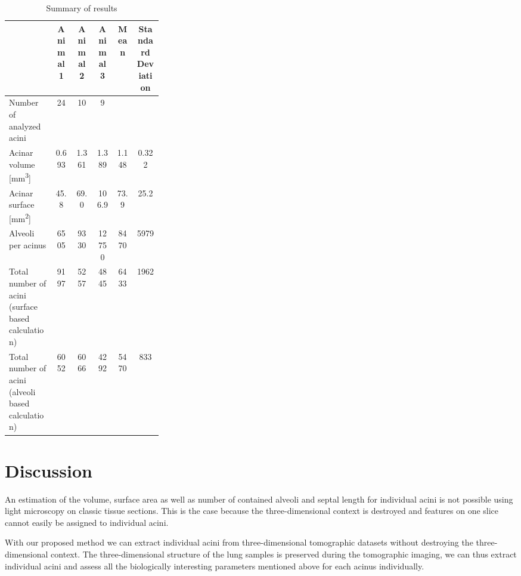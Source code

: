 \documentclass[a4paper,DIV=calc,abstract,english]{scrartcl}
\newcommand{\numberofaciniB}{24}
\newcommand{\numberofaciniD}{10}
\newcommand{\numberofaciniE}{9}
\newcommand{\totalnumberofaciniB}{9197}
\newcommand{\totalnumberofaciniD}{5257}
\newcommand{\totalnumberofaciniE}{4845}
\newcommand{\meantotalnumberofacini}{6433}
\newcommand{\meantotalnumberofaciniSTD}{1962} %
\newcommand{\totalnumberofaciniBVariant}{6052}
\newcommand{\totalnumberofaciniDVariant}{6066}
\newcommand{\totalnumberofaciniEVariant}{4292}
\newcommand{\meantotalnumberofaciniVariant}{5470}
\newcommand{\meantotalnumberofaciniSTDVariant}{833} %
\newcommand{\acinarvolumeB}{0.693} %
\newcommand{\acinarvolumeD}{1.361} %
\newcommand{\acinarvolumeE}{1.389} %
\newcommand{\meanacinarvolume}{1.148} %
\newcommand{\meanacinarvolumeSTD}{0.322} %
\newcommand{\numberofalveoliB}{6505}
\newcommand{\numberofalveoliD}{9330}
\newcommand{\numberofalveoliE}{12750}
\newcommand{\meannumberofalveoli}{8470} %
\newcommand{\meannumberofalveoliSTD}{5979}
\newcommand{\acinarsurfaceB}{45.8} %
\newcommand{\acinarsurfaceD}{69.0} %
\newcommand{\acinarsurfaceE}{106.9} %
\newcommand{\meanacinarsurface}{73.9} %
\newcommand{\meanacinarsurfaceSTD}{25.2}
\begin{document}
\begin{table}[htb]
	\centering
	\caption{Summary of results}
	\begin{tabular}{p{0.3\linewidth}ccccc}
	\toprule
																	& Animal 1 & Animal 2 & Animal 3 & Mean & Standard Deviation \\
	\midrule
	Number of analyzed acini 									& \numberofaciniB & \numberofaciniD & \numberofaciniE & & \\
	Acinar volume [\si{\milli\meter\cubed}]				& \acinarvolumeB & \acinarvolumeD & \acinarvolumeE & \meanacinarvolume & \meanacinarvolumeSTD \\
	Acinar surface [\si{\milli\meter\squared}]			& \acinarsurfaceB & \acinarsurfaceD & \acinarsurfaceE & \meanacinarsurface & \meanacinarsurfaceSTD \\
	Alveoli per acinus 											& \numberofalveoliB & \numberofalveoliD & \numberofalveoliE & \meannumberofalveoli & \meannumberofalveoliSTD \\
	Total number of acini (surface based calculation)	& \totalnumberofaciniB & \totalnumberofaciniD & \totalnumberofaciniE & \meantotalnumberofacini & \meantotalnumberofaciniSTD \\
	Total number of acini (alveoli based calculation)	& \totalnumberofaciniBVariant & \totalnumberofaciniDVariant & \totalnumberofaciniEVariant & \meantotalnumberofaciniVariant & \meantotalnumberofaciniSTDVariant \\
	\bottomrule
	\end{tabular}
	\label{tab:results}
\end{table}

\section{Discussion}\label{sec:discussion}
An estimation of the volume, surface area as well as number of contained alveoli and septal length for individual acini is not possible using light microscopy on classic tissue sections. This is the case because the three-dimensional context is destroyed and features on one slice cannot easily be assigned to individual acini.

With our proposed method we can extract individual acini from three-dimensional tomographic datasets without destroying the three-dimensional context. The three-dimensional structure of the lung samples is preserved during the tomographic imaging, we can thus extract individual acini and assess all the biologically interesting parameters mentioned above for each acinus individually.
\end{document}
